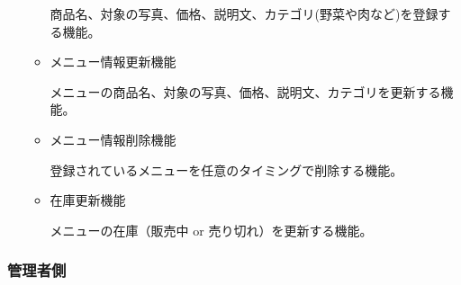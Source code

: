 \begin{itemize}
\begin{itemize}
        商品名、対象の写真、価格、説明文、カテゴリ(野菜や肉など)を登録する機能。
        \item メニュー情報更新機能
        
        メニューの商品名、対象の写真、価格、説明文、カテゴリを更新する機能。
        \item メニュー情報削除機能
        
        登録されているメニューを任意のタイミングで削除する機能。

        \item 在庫更新機能
        
        メニューの在庫（販売中 or 売り切れ）を更新する機能。
    \end{itemize}
  
\end{itemize}

\subsubsection{管理者側}

